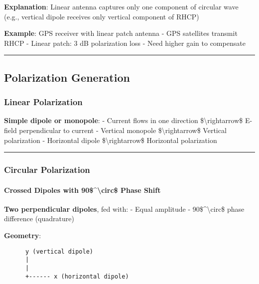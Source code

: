 \textbf{Explanation}: Linear antenna captures only one component of
circular wave (e.g., vertical dipole receives only vertical component of
RHCP)

\textbf{Example}: GPS receiver with linear patch antenna - GPS
satellites transmit RHCP - Linear patch: 3 dB polarization loss - Need
higher gain to compensate

\begin{center}\rule{0.5\linewidth}{0.5pt}\end{center}

\subsection{Polarization Generation}\label{polarization-generation}

\subsubsection{Linear Polarization}\label{linear-polarization-1}

\textbf{Simple dipole or monopole}: - Current flows in one direction
\$\textbackslash rightarrow\$ E-field perpendicular to current -
Vertical monopole \$\textbackslash rightarrow\$ Vertical polarization -
Horizontal dipole \$\textbackslash rightarrow\$ Horizontal polarization

\begin{center}\rule{0.5\linewidth}{0.5pt}\end{center}

\subsubsection{Circular Polarization}\label{circular-polarization-1}

\paragraph{Crossed Dipoles with 90\$\^{}\textbackslash circ\$ Phase
Shift}\label{crossed-dipoles-with-90-phase-shift}

\textbf{Two perpendicular dipoles}, fed with: - Equal amplitude -
90\$\^{}\textbackslash circ\$ phase difference (quadrature)

\textbf{Geometry}:

\begin{verbatim}
      y (vertical dipole)
      |
      |
      +------ x (horizontal dipole)
\end{verbatim}

